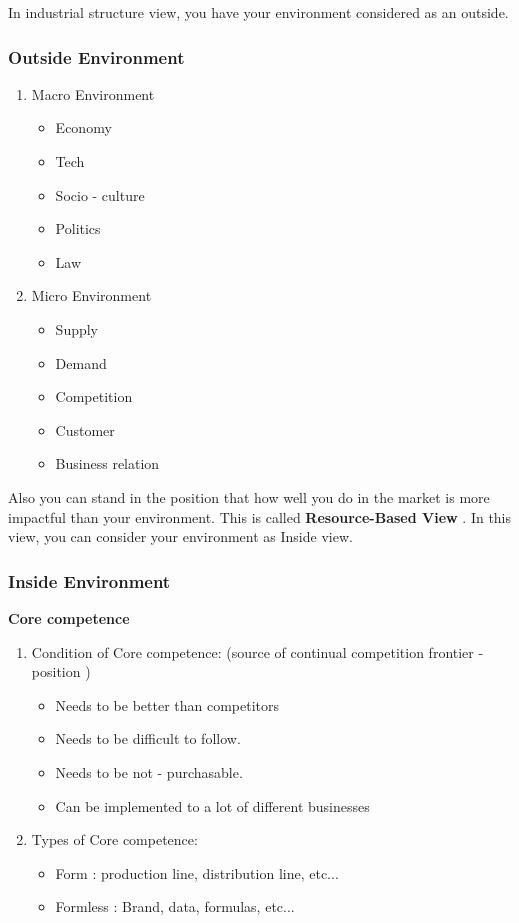 \documentclass[12pt]{article}
\newcommand{\tb}{\textbf}
\begin{document}
In industrial structure view, you have your environment considered as an outside.
\subsubsection{Outside Environment}
\begin{enumerate}
	\item Macro Environment
	\begin{itemize}
		\item Economy
		\item Tech
		\item Socio - culture
		\item Politics
		\item Law
	\end{itemize}
	\item Micro Environment
	\begin{itemize}
		\item Supply
		\item Demand
		\item Competition
		\item Customer
		\item Business relation
	\end{itemize}
\end{enumerate}

Also you can stand in the position that how well you do in the market is more impactful than your environment. This is called \tb{Resource-Based View} . In this view, you can consider your environment as Inside view.
\subsubsection{Inside Environment}
\tb{Core competence}
\begin{enumerate}
	\item Condition of Core competence: (source of continual competition  frontier -position )
	\begin{itemize}
		\item Needs to be better than competitors
		\item Needs to be difficult to follow.
		\item Needs to be not - purchasable.
		\item Can be implemented to a lot of different businesses
	\end{itemize}
	\item Types of Core competence:
	\begin{itemize}
		\item Form : production line, distribution line, etc...
		\item Formless : Brand, data, formulas, etc...
	\end{itemize}

\end{enumerate}
\end{document}
